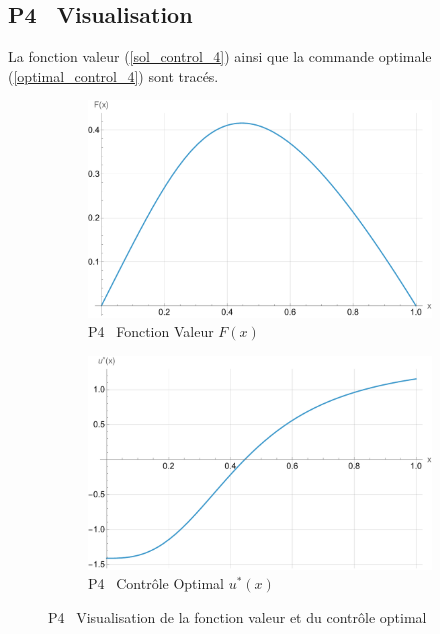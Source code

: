 \subsection{P4 \textemdash~Visualisation}
La fonction valeur (\ref{sol_control_4}) ainsi que la commande optimale (\ref{optimal_control_4}) sont tracés.
\begin{figure}[htb]
    \centering
    \begin{subfigure}{0.49\linewidth}
        \includegraphics[width=\linewidth]{img/validation/P4/p4_value.pdf}
        \caption{P4 \textemdash~Fonction Valeur $F(x)$}\label{fig:ValueVisualisation4}
    \end{subfigure}
    \hfill
    \begin{subfigure}{0.49\linewidth}
        \includegraphics[width=\linewidth]{img/validation/P4/p4_control.pdf}
        \caption{P4 \textemdash~Contrôle Optimal $u^*(x)$}\label{fig:ControlVisualisation4}
    \end{subfigure}
    \caption{P4 \textemdash~Visualisation de la fonction valeur et du contrôle optimal}\label{fig:ValueControlComparison4}
\end{figure}
